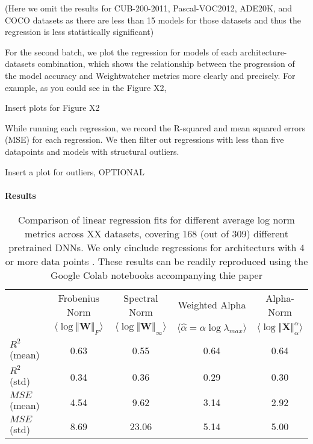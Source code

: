 
(Here we omit the results for CUB-200-2011, Pascal-VOC2012, ADE20K, and COCO datasets as there are less than 15 models for those datasets and thus the regression is less statistically significant)


For the second batch, we plot the regression for models of each architecture-datasets combination, which shows the relationship between the progression of the model accuracy and Weightwatcher metrics more clearly and precisely. For example, as you could see in the Figure X2, 


Insert plots for Figure X2

While running each regression, we record the R-squared and mean squared errors (MSE) for each regression. We then filter out regressions with less than five datapoints and models with structural outliers.


Insert a plot for outliers, OPTIONAL


\paragraph{Results}
\begin{table}[t]
\small
\begin{center}
\begin{tabular}{|p{1in}|c|c|c|c|}
\hline
    & Frobenius Norm & Spectral Norm & Weighted Alpha & Alpha-Norm \\
    & $\langle\log\Vert\mathbf{W}\Vert_{F}\rangle$ & $\langle\log\Vert\mathbf{W}\Vert_{\infty}\rangle$ & $\langle\hat{\alpha}=\alpha\log\lambda_{max}\rangle$ & $\langle\log\Vert\mathbf{X}\Vert^{\alpha}_{\alpha}\rangle$ \\
\hline
$R^{2}$ (mean) & 0.63 &0.55 &0.64 &0.64 \\
$R^{2}$ (std)  & 0.34 &0.36 &0.29 &0.30 \\
\hline
$MSE$ (mean)   & 4.54 &9.62 &3.14 &2.92 \\
$MSE$ (std)    & 8.69 &23.06 &5.14 &5.00 \\
\hline
\end{tabular}
\end{center}
\caption{Comparison of linear regression fits for different average log norm metrics across XX datasets, covering 168 (out of 309) different pretrained DNNs.  We only cinclude regressions for architecturs with 4 or more data points .  These results can be readily reproduced using the Google Colab notebooks accompanying thie paper\cite{notebooks}}
\label{table:nlp}
\end{table}


